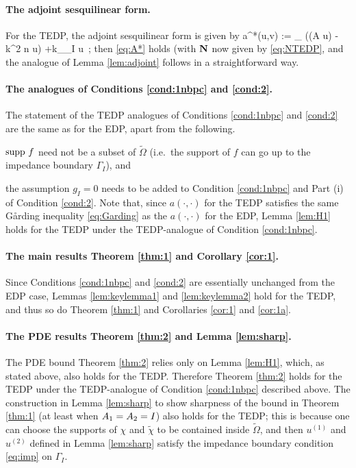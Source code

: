 \paragraph{The adjoint sesquilinear form.} For the TEDP, the adjoint sesquilinear form is given by 
\beq\label{eq:TEDPadjoint}
a^*(u,v) := \int_{\DR} 
\Big((A \grad u)\cdot\grad \vb
 - k^2 n u\vb\Big) +\ri k\int_{\Gamma_I} \gamma u\, ;
\eeq
then \eqref{eq:A*} holds (with $\mathbf{N}$ now given by \eqref{eq:NTEDP}, and the analogue of Lemma \ref{lem:adjoint} follows in a straightforward way.


\paragraph{The analogues of Conditions \ref{cond:1nbpc} and \ref{cond:2}.}
The statement of the TEDP analogues of Conditions \ref{cond:1nbpc} and \ref{cond:2} are the same as for the EDP, apart from the following.
\ben
\item
$\operatorname{supp} \,f$ need not be a subset of $\widetilde{\Omega}$ (i.e.~the support of $f$ can go up to the impedance boundary $\Gamma_I$), and
\item the assumption $g_I= 0$ needs to be added to Condition \ref{cond:1nbpc} and Part (i) of Condition \ref{cond:2}.
\een
 Note that, since $a(\cdot,\cdot)$ for the TEDP satisfies the same G\aa rding inequality \eqref{eq:Garding} as the $a(\cdot,\cdot)$ for the EDP, Lemma \ref{lem:H1} holds for the TEDP under the TEDP-analogue of Condition \ref{cond:1nbpc}.

\paragraph{The main results Theorem \ref{thm:1} and Corollary \ref{cor:1}.}
Since Conditions \ref{cond:1nbpc} and \ref{cond:2} are essentially unchanged from the EDP case, Lemmas \ref{lem:keylemma1} and \ref{lem:keylemma2} hold for the TEDP, and thus so do Theorem \ref{thm:1} and Corollaries \ref{cor:1} and \ref{cor:1a}.

\paragraph{The PDE results Theorem \ref{thm:2} and Lemma \ref{lem:sharp}.}

The PDE bound Theorem \ref{thm:2} relies only on Lemma \ref{lem:H1}, which, as stated above, also holds for the TEDP. Therefore Theorem \ref{thm:2} holds for the TEDP under the TEDP-analogue of Condition \ref{cond:1nbpc} described above. The construction in Lemma \ref{lem:sharp} to show sharpness of the bound in Theorem \ref{thm:1} (at least when $A_{1}= A_{2}= I$) also holds for the TEDP; this is because one can choose the supports of $\chi$ and $\widetilde{\chi}$ to be contained inside $\widetilde{\Omega}$, and then $u^{(1)}$ and $u^{(2)}$ defined in Lemma \ref{lem:sharp} satisfy the impedance boundary condition \eqref{eq:imp} on $\Gamma_I$.

